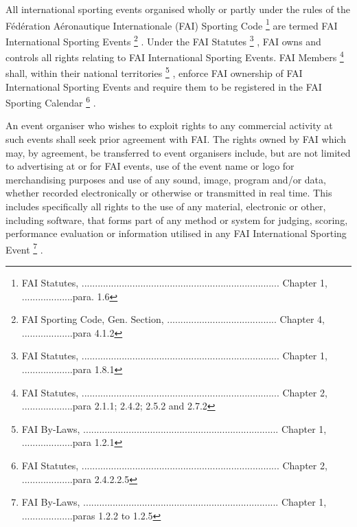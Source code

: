 All international sporting events organised wholly or partly under the rules of
the Fédération Aéronautique Internationale (FAI) Sporting Code
\footnote{FAI Statutes, ..........................................................................  Chapter 1, ...................para. 1.6}
are termed FAI International Sporting Events
\footnote{FAI Sporting Code, Gen. Section, ......................................... Chapter 4, ...................para 4.1.2}
. Under the FAI Statutes
\footnote{FAI Statutes, .......................................................................... Chapter 1, ...................para 1.8.1}
, FAI owns and controls all rights relating to FAI International Sporting
Events. FAI Members
\footnote{FAI Statutes, .......................................................................... Chapter 2, ...................para 2.1.1; 2.4.2; 2.5.2 and 2.7.2}
shall, within their national territories
\footnote{FAI By-Laws, ......................................................................... Chapter 1, ...................para 1.2.1}
, enforce FAI ownership of FAI International Sporting Events and require them
to be registered in the FAI Sporting Calendar
\footnote{FAI Statutes, .......................................................................... Chapter 2, ...................para 2.4.2.2.5}
.

An event organiser who wishes to exploit rights to any commercial activity at
such events shall seek prior agreement with FAI. The rights owned by FAI which
may, by agreement, be transferred to event organisers include, but are not
limited to advertising at or for FAI events, use of the event name or logo for
merchandising purposes and use of any sound, image, program and/or data,
whether recorded electronically or otherwise or transmitted in real time. This
includes specifically all rights to the use of any material, electronic or
other, including software, that forms part of any method or system for judging,
scoring, performance evaluation or information utilised in any FAI
International Sporting Event
\footnote{FAI By-Laws, ......................................................................... Chapter 1, ...................paras 1.2.2 to 1.2.5}
.


